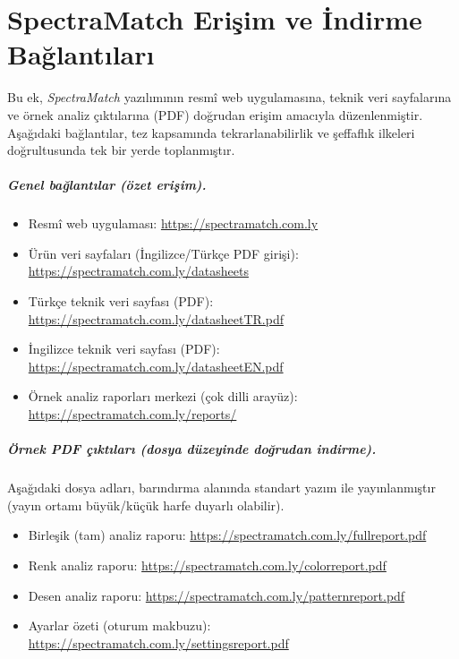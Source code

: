 
\chapter{SpectraMatch Erişim ve İndirme Bağlantıları}
\label{app:spectramatch-erisim}

\noindent Bu ek, \textit{SpectraMatch} yazılımının resmî web uygulamasına, teknik veri sayfalarına ve örnek analiz çıktılarına (PDF) doğrudan erişim amacıyla düzenlenmiştir. Aşağıdaki bağlantılar, tez kapsamında tekrarlanabilirlik ve şeffaflık ilkeleri doğrultusunda tek bir yerde toplanmıştır.

\paragraph*{Genel bağlantılar (özet erişim).}
\begin{itemize}
  \item Resmî web uygulaması: \url{https://spectramatch.com.ly}
  \item Ürün veri sayfaları (İngilizce/Türkçe PDF girişi): \url{https://spectramatch.com.ly/datasheets}
  \item Türkçe teknik veri sayfası (PDF): \url{https://spectramatch.com.ly/datasheetTR.pdf}
  \item İngilizce teknik veri sayfası (PDF): \url{https://spectramatch.com.ly/datasheetEN.pdf}
  \item Örnek analiz raporları merkezi (çok dilli arayüz): \url{https://spectramatch.com.ly/reports/}
\end{itemize}

\paragraph*{Örnek PDF çıktıları (dosya düzeyinde doğrudan indirme).}
Aşağıdaki dosya adları, barındırma alanında standart yazım ile yayınlanmıştır (yayın ortamı büyük/küçük harfe duyarlı olabilir).
\begin{itemize}
  \item Birleşik (tam) analiz raporu: \url{https://spectramatch.com.ly/fullreport.pdf}
  \item Renk analiz raporu: \url{https://spectramatch.com.ly/colorreport.pdf}
  \item Desen analiz raporu: \url{https://spectramatch.com.ly/patternreport.pdf}
  \item Ayarlar özeti (oturum makbuzu): \url{https://spectramatch.com.ly/settingsreport.pdf}
\end{itemize}

